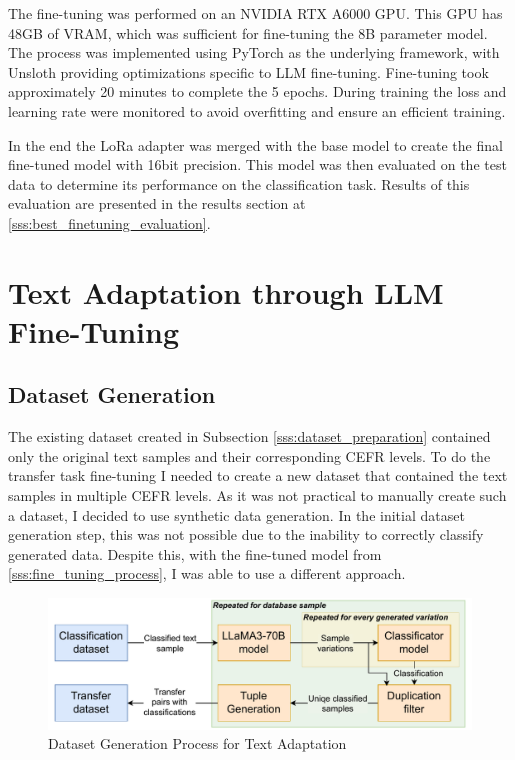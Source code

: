 The fine-tuning was performed on an NVIDIA RTX A6000 GPU. This GPU has 48GB of VRAM, which was sufficient for fine-tuning the 8B parameter model. The process was implemented using PyTorch \citep{Paszke2019} as the underlying framework, with Unsloth providing optimizations specific to LLM fine-tuning. Fine-tuning took approximately 20 minutes to complete the 5 epochs. During training the loss and learning rate were monitored to avoid overfitting and ensure an efficient training.

In the end the LoRa adapter was merged with the base model to create the final fine-tuned model with 16bit precision. This model was then evaluated on the test data to determine its performance on the classification task. Results of this evaluation are presented in the results section at \ref{sss:best_finetuning_evaluation}.

\section{Text Adaptation through LLM Fine-Tuning}
\label{s:llm_fine_tuning}
\subsection{Dataset Generation}
\label{ss:dataset_generation}
The existing dataset created in Subsection \ref{sss:dataset_preparation} contained only the original text samples and their corresponding CEFR levels. To do the transfer task fine-tuning I needed to create a new dataset that contained the text samples in multiple CEFR levels. As it was not practical to manually create such a dataset, I decided to use synthetic data generation. In the initial dataset generation step, this was not possible due to the inability to correctly classify generated data. Despite this, with the fine-tuned model from \ref{sss:fine_tuning_process}, I was able to use a different approach. \\

\begin{figure}[h]
    \centering
    \includegraphics[width=\textwidth]{img/TransferDatasetCreation2.pdf}
    \caption{Dataset Generation Process for Text Adaptation}
    \label{fig:dataset_generation_process}
\end{figure}

